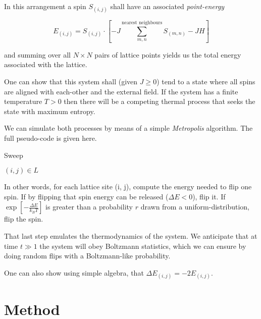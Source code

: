 \documentclass[12pt]{article}
\begin{document}
In this arrangement a spin \( S_{(i, j)}\) shall have an associated \emph{point-energy}

\begin{equation}\label{eq:point_energy}
  E_{(i, j)} = S_{(i, j)} \cdot \left[ -J  \sum_{m, n}^{\text{nearest neighbours}} S_{(m,n)} - JH \right] 
\end{equation}

and summing over all \(N \times N\) pairs of lattice points yields us the total energy associated with the lattice.

One can show that this system shall (given \(J \geq 0\)) tend to a state where all spins are aligned with each-other and the external field. If the system has a finite temperature \(T>0\) then there will be a competing thermal process that seeks the state with maximum entropy.

We can simulate both processes by means of a simple \emph{Metropolis} algorithm. The full pseudo-code is given here.

\begin{algorithm}
  \caption{Sweep}\label{euclid}
\begin{algorithmic}[1]
  \For{} \( (i, j) \in L \)
  \EndIf
  \EndFor
  \EndProcedure
\end{algorithmic}
\end{algorithm}

In other words, for each lattice site (i, j), compute the energy needed to flip one spin. If by flipping that spin energy can be released (\(\Delta E < 0\)), flip it. If \(\exp \left[ - \frac{\Delta E }{ k_B T} \right] \) is greater than a probability \(r \) drawn from a uniform-distribution, flip the spin.

That last step emulates the thermodynamics of the system. We anticipate that at time \( t \gg 1\)  the system will obey Boltzmann statistics, which we can ensure by doing random flips with a Boltzmann-like probability.

One can also show using simple algebra, that \(\Delta E_{(i, j)} = -2 E_{(i, j)}\).

\section{Method}\label{sec:simulation_data}
\end{document}
